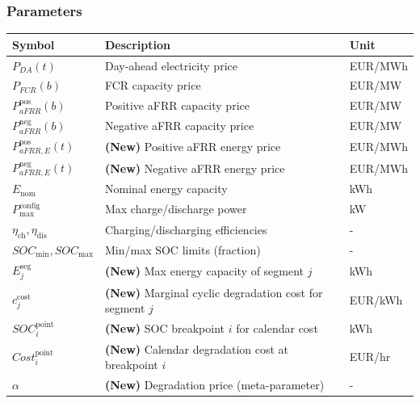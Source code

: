 \documentclass[11pt, a4paper]{article}
\begin{document}
\subsubsection{Parameters}
\begin{tabular}{@{}lll}
\toprule
Symbol & Description & Unit \\
\midrule
$P_{DA}(t)$ & Day-ahead electricity price & EUR/MWh \\
$P_{FCR}(b)$ & FCR capacity price & EUR/MW \\
$P^{\mathrm{pos}}_{aFRR}(b)$ & Positive aFRR capacity price & EUR/MW \\
$P^{\mathrm{neg}}_{aFRR}(b)$ & Negative aFRR capacity price & EUR/MW \\
$P^{\mathrm{pos}}_{aFRR,E}(t)$ & \textbf{(New)} Positive aFRR energy price & EUR/MWh \\
$P^{\mathrm{neg}}_{aFRR,E}(t)$ & \textbf{(New)} Negative aFRR energy price & EUR/MWh \\
$E_{\mathrm{nom}}$ & Nominal energy capacity & kWh \\
$P^{\mathrm{config}}_{\max}$ & Max charge/discharge power & kW \\
$\eta_{\mathrm{ch}}, \eta_{\mathrm{dis}}$ & Charging/discharging efficiencies & - \\
$SOC_{\min}, SOC_{\max}$ & Min/max SOC limits (fraction) & - \\
$E^{\mathrm{seg}}_{j}$ & \textbf{(New)} Max energy capacity of segment $j$ & kWh \\
$c^{\mathrm{cost}}_{j}$ & \textbf{(New)} Marginal cyclic degradation cost for segment $j$ & EUR/kWh \\
$SOC^{\mathrm{point}}_i$ & \textbf{(New)} SOC breakpoint $i$ for calendar cost & kWh \\
$Cost^{\mathrm{point}}_i$ & \textbf{(New)} Calendar degradation cost at breakpoint $i$ & EUR/hr \\
$\alpha$ & \textbf{(New)} Degradation price (meta-parameter) & - \\
\bottomrule
\end{tabular}
\end{document}
